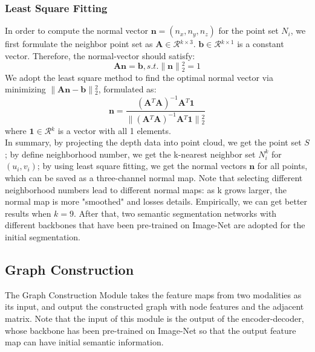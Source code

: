 ﻿\documentclass[journal]{IEEEtran}
\begin{document}
    \subsubsection{Least Square Fitting}  In order to compute the normal vector ${\mathbf{n}}= (n_{x},n_{y},n_{z})$ for the point set $N_{i}$, we first formulate the neighbor point set as $\mathbf{A} \in \mathcal{R}{^{k \times 3}}$. $\mathbf{b} \in \mathcal{R}{^{k \times 1}}$ is a constant vector. Therefore, the normal-vector should satisfy:
    \begin{equation}
    \mathbf{A}{\mathbf{n}}=\mathbf{b}, s.t.\|{\mathbf{n}}\|{_2^2}=1
    \end{equation}
    We adopt the least square method to find the optimal normal vector via minimizing $ \|\mathbf{A}{\mathbf{n}}-\mathbf{b}\|{_2^2}$, formulated as:
    \begin{equation}
    \mathbf{n}=\frac{(\mathbf{A}{^T}\mathbf{A})^{-1}\mathbf{A}{^T}\mathbf{1}}{\|(\mathbf{A}{^T}\mathbf{A})^{-1}\mathbf{A}{^T}\mathbf{1}\|{_2^2}} 
    \end{equation}
    where $\mathbf{1}\in \mathcal{R}{^k}$ is a vector with all 1 elements.  \\

 
    In summary, by projecting the depth data into point cloud, we get the point set $S$; by define neighborhood number, we get the k-nearest neighbor set $N_i^k$ for $(u_i, v_i)$; by using least square fitting, we get the normal vectors $ \mathbf{n}$ for all points, which can be saved as a three-channel normal map. Note that selecting different neighborhood numbers lead to different normal maps: as k grows larger, the normal map is more "smoothed" and losses details. Empirically, we can get better results when $k=9$. After that, two semantic segmentation networks with different backbones that have been pre-trained on Image-Net are adopted for the initial segmentation.


\subsection{Graph Construction}   \label{sec_sub_construct_graph}
   
    The Graph Construction Module takes the feature maps from two modalities as its input, and output the constructed graph with node features and the adjacent matrix. Note that the input of this module is the output of the encoder-decoder, whose backbone has been pre-trained on Image-Net so that the output feature map can have initial semantic information. 
  
\end{document}

